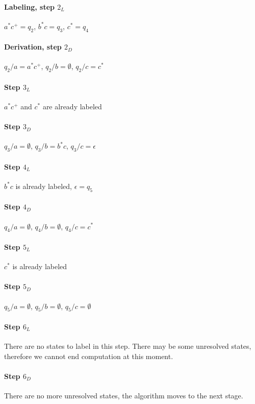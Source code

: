 \documentclass{article}
\begin{document}
\begin{multicols}{2}

\paragraph{Labeling, step $2_L$} $a^*c^+ = q_2$, $b^*c = q_3$, $c^* = q_4$

\paragraph{Derivation, step $2_D$} $q_2 / a = a^*c^+$, $q_2 / b = \emptyset$, $q_2 / c = c^*$

\paragraph{Step $3_L$} $a^*c^+$ and $c^*$ are already labeled

\paragraph{Step $3_D$} $q_3 / a = \emptyset$, $q_3 / b = b^*c$, $q_3 / c = \epsilon$

\paragraph{Step $4_L$} $b^*c$ is already labeled, $\epsilon = q_5$

\paragraph{Step $4_D$} $q_4 / a = \emptyset$, $q_4 / b = \emptyset$, $q_4 / c = c^*$

\paragraph{Step $5_L$} $c^*$ is already labeled

\paragraph{Step $5_D$} $q_5 / a = \emptyset$, $q_5 / b = \emptyset$, $q_5 / c = \emptyset$

\paragraph{Step $6_L$} There are no states to label in this step. There may be some unresolved
states, therefore we cannot end computation at this moment.

\paragraph{Step $6_D$} There are no more unresolved states, the algorithm moves to the next stage.

\end{multicols}
\end{document}
